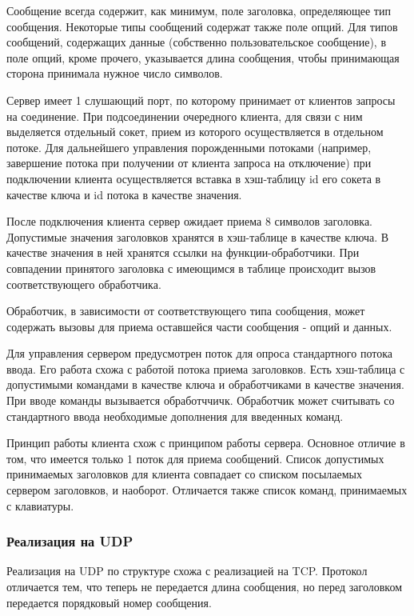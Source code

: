 Сообщение всегда содержит, как минимум, поле заголовка, определяющее тип сообщения. Некоторые типы сообщений содержат также поле опций. Для типов сообщений, содержащих данные (собственно пользовательское сообщение), в поле опций, кроме прочего, указывается длина сообщения, чтобы принимающая сторона принимала нужное число символов.

Сервер имеет 1 слушающий порт, по которому принимает от клиентов запросы на соединение. При подсоединении очередного клиента, для связи с ним выделяется отдельный сокет, прием из которого осуществляется в отдельном потоке. Для дальнейшего управления порожденными потоками (например, завершение потока при получении от клиента запроса на отключение) при подключении клиента осуществляется вставка в хэш-таблицу id его сокета в качестве ключа и id потока в качестве значения.

После подключения клиента сервер ожидает приема 8 символов заголовка. Допустимые значения заголовков хранятся в хэш-таблице в качестве ключа. В качестве значения в ней хранятся ссылки на функции-обработчики. При совпадении принятого заголовка с имеющимся в таблице происходит вызов соответствующего обработчика.

Обработчик, в зависимости от соответствующего типа сообщения, может содержать вызовы для приема оставшейся части сообщения - опций и данных.

Для управления сервером предусмотрен поток для опроса стандартного потока ввода. Его работа схожа с работой потока приема заголовков. Есть хэш-таблица с допустимыми командами в качестве ключа и обработчиками в качестве значения. При вводе команды вызывается обработччичк. Обработчик может считывать со стандартного ввода необходимые дополнения для введенных команд.

Принцип работы клиента схож с принципом работы сервера. Основное отличие в том, что имеется только 1 поток для приема сообщений. Список допустимых принимаемых заголовков для клиента совпадает со списком посылаемых сервером заголовков, и наоборот. Отличается также список команд, принимаемых с клавиатуры.

\subsubsection{Реализация на UDP}

Реализация на UDP по структуре схожа с реализацией на TCP. Протокол отличается тем, что теперь не передается длина сообщения, но перед заголовком передается порядковый номер сообщения.

